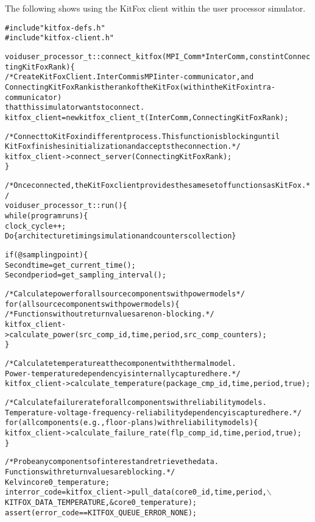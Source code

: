 \noindent
The following shows using the KitFox client within the user processor simulator.
{
\fontsize{10pt}{11pt}\selectfont
\begin{alltt}
#include "kitfox-defs.h"
#include "kitfox-client.h"

void user_processor_t::connect_kitfox(MPI_Comm *InterComm, const int ConnectingKitFoxRank) \{
    /* Create KitFox Client. InterComm is MPI inter-communicator, and
    ConnectingKitFoxRank is the rank of the KitFox (within the KitFox intra-communicator) 
    that this simulator wants to connect.
    kitfox_client = new kitfox_client_t(InterComm, ConnectingKitFoxRank);
    
    /* Connect to KitFox in different process. This function is blocking until 
    KitFox finishes initialization and accepts the connection. */
    kitfox_client->connect_server(ConnectingKitFoxRank);
\}

/* Once connected, the KitFox client provides the same set of functions as KitFox. */
void user_processor_t::run() \{
    while (program runs) \{
        clock_cycle++;
        Do \{architecture timing simulation and counters collection\}
    
        if (@sampling point) \{
            Second time = get_current_time();
            Second period = get_sampling_interval();
        
            /* Calculate power for all source components with power models */
            for (all source components with power models) \{
                /* Functions without return values are non-blocking. */
                kitfox_client->calculate_power(src_comp_id, time, period, src_comp_counters);
            \}
        
            /* Calculate temperature at the component with thermal model. 
            Power-temperature dependency is internally captured here. */
            kitfox_client->calculate_temperature(package_cmp_id, time, period, true);
        
            /* Calculate failure rate for all components with reliability models. 
            Temperature-voltage-frequency-reliability dependency is captured here. */
            for (all components (e.g., floor-plans) with reliability models) \{
                kitfox_client->calculate_failure_rate(flp_comp_id, time, period, true);
            \}
        
            /* Probe any components of interest and retrieve the data. 
            Functions with return values are blocking. */
            Kelvin core0_temperature;
            int error_code = kitfox_client->pull_data(core0_id, time, period,\(\backslash\)
                             KITFOX_DATA_TEMPERATURE, &core0_temperature);
            assert(error_code == KITFOX_QUEUE_ERROR_NONE);
        

\end{alltt}}
